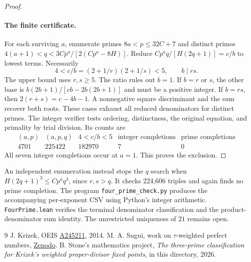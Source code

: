 \documentclass[11pt]{article}
\begin{document}
\begin{proof}
\paragraph{The finite certificate.} For each surviving $a$, enumerate primes $8a<p\le32C+7$ and distinct primes $4(a+1)<q<3Cp^a/[2(Cp^a-8H)]$. Reduce $Cp^a q/[H(2q+1)]=c/b$ to lowest terms. Necessarily
\[
 4<c/b=(2+1/r)(2+1/s)<5,\qquad b\mid rs.
\]
The upper bound uses $r,s\ge5$. The ratio rules out $b=1$. If $b=r$ or $s$, the other base is $b(2b+1)/[cb-2b(2b+1)]$ and must be a positive integer. If $b=rs$, then $2(r+s)=c-4b-1$. A nonnegative square discriminant and the sum recover both roots. These cases exhaust all reduced denominators for distinct primes. The integer verifier tests ordering, distinctness, the original equation, and primality by trial division. Its counts are
\[
\begin{array}{r|r|r|r|r}
(a,p)&(a,p,q)&4<c/b<5&\text{integer completions}&\text{prime completions}\\\hline
4701&225422&182970&7&0
\end{array}
\]
All seven integer completions occur at $a=1$. This proves the exclusion.\end{proof}
An independent enumeration instead stops the $q$ search when $H(2q+1)^3\le Cp^a q^3$, since $r,s>q$. It checks 224,606 triples and again finds no prime completion. The program \texttt{four\_prime\_check.py} produces the accompanying per-exponent CSV using Python's integer arithmetic. \texttt{FourPrime.lean} verifies the terminal denominator classification and the product-denominator sum identity. The unrestricted uniqueness of $21$ remains open.
\begin{thebibliography}{9}
 J. Krizek, OEIS \href{https://oeis.org/A245211}{A245211}, 2014.
 M. A. Sugui, work on $\tau$-weighted perfect numbers, \href{https://doi.org/10.5281/zenodo.24437886}{Zenodo}.
 B. Stone's mathematics project, \emph{The three-prime classification for Krizek's weighted proper-divisor fixed points}, in this directory, 2026.
\end{thebibliography}
\end{document}
